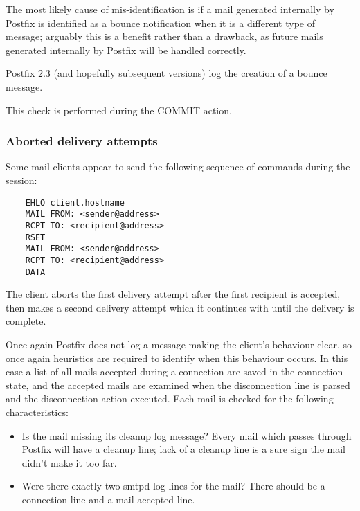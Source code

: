\documentclass[a4paper,12pt,draft]{article}
\begin{document}
The most likely cause of mis-identification is if a mail generated
internally by Postfix is identified as a bounce notification when it is a
different type of message; arguably this is a benefit rather than a
drawback, as future mails generated internally by Postfix will be handled
correctly.

Postfix 2.3 (and hopefully subsequent versions) log the creation of a
bounce message.

This check is performed during the COMMIT action.

\subsubsection{Aborted delivery attempts}

\label{aborted-delivery-attempts}

Some mail clients appear to send the following sequence of commands during
the \SMTP{} session:

\begin{verbatim}
    EHLO client.hostname
    MAIL FROM: <sender@address>
    RCPT TO: <recipient@address>
    RSET
    MAIL FROM: <sender@address>
    RCPT TO: <recipient@address>
    DATA
\end{verbatim}

The client aborts the first delivery attempt after the first recipient is
accepted, then makes a second delivery attempt which it continues with
until the delivery is complete.

Once again Postfix does not log a message making the client's behaviour
clear, so once again heuristics are required to identify when this
behaviour occurs.  In this case a list of all mails accepted during a
connection are saved in the connection state, and the accepted mails are
examined when the disconnection line is parsed and the disconnection action
executed.  Each mail is checked for the following characteristics:

\begin{itemize}

    \item Is the mail missing its cleanup log message?  Every mail which
        passes through Postfix will have a cleanup line; lack of a cleanup
        line is a sure sign the mail didn't make it too far.

    \item Were there exactly two smtpd log lines for the mail?  There
        should be a connection line and a mail accepted line.

\end{itemize}
\end{document}
